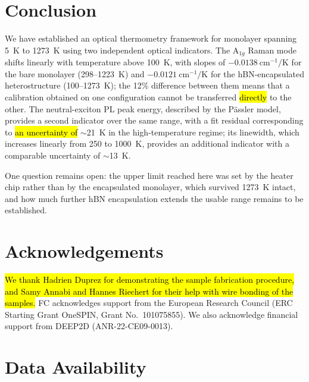 \documentclass[letterpaper]{article}
\DeclareRobustCommand{\rev}[1]{#1}
\DeclareRobustCommand{\revB}[1]{\hl{#1}}
\begin{document}
\section{Conclusion}

We have established an optical thermometry framework for monolayer 
spanning 5~K to 1273~K using two independent optical indicators. The
A$_{1g}$ Raman mode shifts linearly with temperature above 100~K, with slopes
of $-0.0138~\mathrm{cm^{-1}/K}$ for the bare monolayer (298--1223~K) and
$-0.0121~\mathrm{cm^{-1}/K}$ for the hBN-encapsulated heterostructure
(100--1273~K); the 12\% difference between them means that a calibration
obtained on one configuration cannot be transferred \revB{directly} to the other. The
neutral-exciton PL peak energy, described by the Pässler model, provides a
second indicator over the same range, with a fit residual corresponding to
\revB{an uncertainty of} $\sim$21~K in the high-temperature regime\rev{; its linewidth, which increases
linearly from 250 to 1000~K, provides an additional indicator with a
comparable uncertainty of $\sim$13~K}.

\rev{One question remains open:} the upper limit reached here was set by the
heater chip rather than by the encapsulated monolayer, which survived 1273~K
intact\rev{, and} how much further hBN encapsulation extends the usable range remains to
be established.

\section*{Acknowledgements}

\revB{We thank Hadrien Duprez for demonstrating the sample fabrication
procedure, and Samy Annabi and Hannes Riechert for their help with wire
bonding of the samples.}
FC acknowledges support from the European Research Council (ERC Starting Grant
OneSPIN, Grant No.\ 101075855). We also acknowledge financial support from
DEEP2D (ANR-22-CE09-0013).

\section*{Data Availability}
\end{document}

